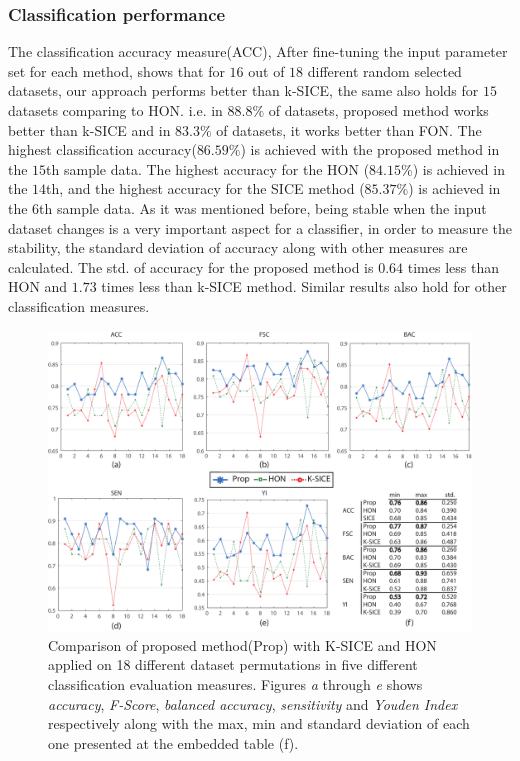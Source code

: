 \documentclass[preprint,12pt]{elsarticle}
\begin{document}
	\subsubsection{Classification performance}
	The classification accuracy measure(ACC), After fine-tuning the input parameter set for each method, shows that for $16$ out of $18$ different random selected datasets, our approach performs better than k-SICE, the same also holds for $15$ datasets comparing to HON. i.e. in $88.8 \%$ of datasets, proposed method works better than k-SICE and in $83.3 \%$ of datasets, it works better than FON.  
	The highest classification accuracy($86.59\%$) is achieved with the proposed method in the $15$th sample data. The highest accuracy for the HON ($84.15\%$) is achieved in the $14$th, and the highest accuracy for the SICE method ($85.37\%$) is achieved in the $6$th sample data. As it was mentioned before, being stable when the input dataset changes is a very important aspect for a classifier, in order to measure the stability, the standard deviation of accuracy along with other measures are
	calculated. The std. of accuracy for the proposed method is $0.64$ times less than HON and $1.73$ times less than k-SICE method. Similar results also hold for other classification measures.
	\begin{figure}
		\centering
		\includegraphics[width=6in]{images/Final-eps.pdf}
		\caption{
			Comparison of proposed method(Prop) with K-SICE and HON 
			applied on 18 different dataset permutations 
			in five different classification evaluation measures.
			Figures \textit{a} through \textit{e} shows \textit{accuracy}, \textit{F-Score}, \textit{balanced accuracy}, \textit{sensitivity} and \textit{Youden Index} respectively
			along with the max, min and standard deviation of each one presented at the embedded table (f). 
		}
		\label{g3.2}
	\end{figure}
	
\end{document}
